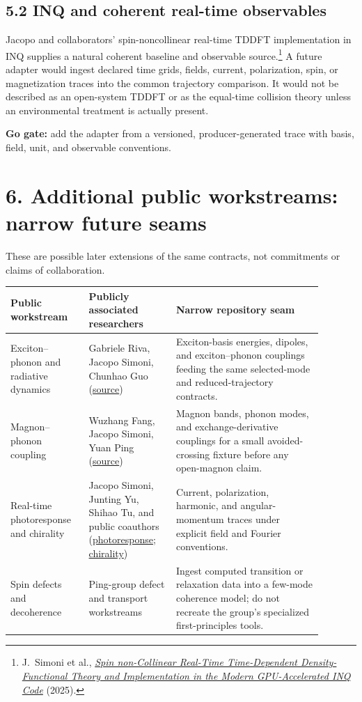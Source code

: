 \documentclass[11pt]{article}
\begin{document}
\subsection*{5.2 INQ and coherent real-time observables}

Jacopo and collaborators' spin-noncollinear real-time TDDFT implementation in
INQ supplies a natural coherent baseline and observable source.\footnote{
J.~Simoni et al.,
\href{https://arxiv.org/abs/2506.21908}{\emph{Spin non-Collinear Real-Time
Time-Dependent Density-Functional Theory and Implementation in the Modern
GPU-Accelerated INQ Code}} (2025).}
A future adapter would ingest declared time grids, fields, current,
polarization, spin, or magnetization traces into the common trajectory
comparison. It would not be described as an open-system TDDFT or as the
equal-time collision theory unless an environmental treatment is actually
present.

\textbf{Go gate:} add the adapter from a versioned, producer-generated trace
with basis, field, unit, and observable conventions.

\section*{6. Additional public workstreams: narrow future seams}

These are possible later extensions of the same contracts, not commitments or
claims of collaboration.

\begin{tabular}{p{0.22\linewidth}p{0.25\linewidth}p{0.42\linewidth}}
\toprule
Public workstream & Publicly associated researchers & Narrow repository seam \\
\midrule
Exciton--phonon and radiative dynamics & Gabriele Riva, Jacopo Simoni, Chunhao
Guo (\href{https://arxiv.org/abs/2504.18071}{source}) &
Exciton-basis energies, dipoles, and exciton--phonon couplings feeding the same
selected-mode and reduced-trajectory contracts. \\
\addlinespace
Magnon--phonon coupling & Wuzhang Fang, Jacopo Simoni, Yuan Ping
(\href{https://arxiv.org/abs/2501.14239}{source}) & Magnon bands,
phonon modes, and exchange-derivative couplings for a small avoided-crossing
fixture before any open-magnon claim. \\
\addlinespace
Real-time photoresponse and chirality & Jacopo Simoni, Junting Yu, Shihao Tu,
and public coauthors
(\href{https://arxiv.org/abs/2601.01059}{photoresponse};
\href{https://arxiv.org/abs/2504.11596}{chirality}) & Current,
polarization, harmonic, and angular-momentum traces under explicit field and
Fourier conventions. \\
\addlinespace
Spin defects and decoherence & Ping-group defect and transport workstreams &
Ingest computed transition or relaxation data into a few-mode coherence model;
do not recreate the group's specialized first-principles tools. \\
\bottomrule
\end{tabular}
\end{document}
